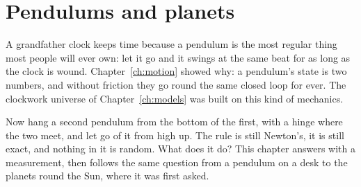 
\chapter{Pendulums and planets}
\label{ch:mechanics}

\noindent
A grandfather clock keeps time because a pendulum is the most regular thing
most people will ever own: let it go and it swings at the same beat for as
long as the clock is wound. Chapter~\ref{ch:motion} showed why: a pendulum's
state is two numbers, and without friction they go round the same closed loop
for ever. The clockwork universe of Chapter~\ref{ch:models} was built on this
kind of mechanics.

Now hang a second pendulum from the bottom of the first, with a hinge where
the two meet, and let go of it from high up. The rule is still Newton's, it
is still exact, and nothing in it is random. What does it do? This chapter
answers with a measurement, then follows the same question from a pendulum on
a desk to the planets round the Sun, where it was first asked.

\begin{outcomes}
\end{outcomes}

